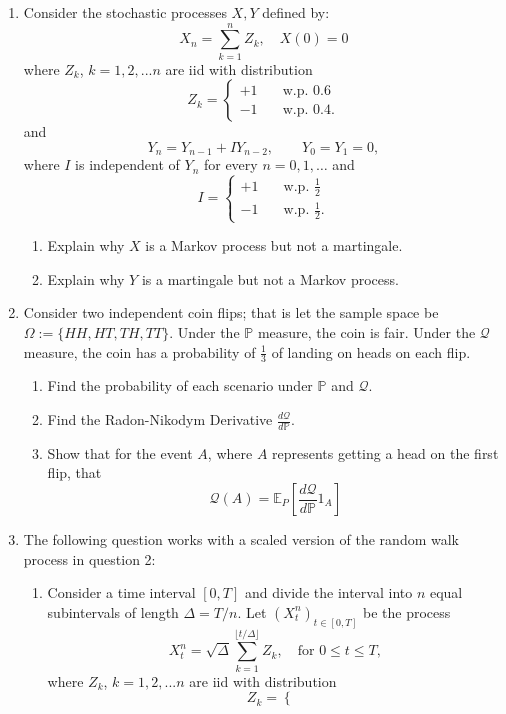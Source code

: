 \documentclass[11pt]{article}
\newcommand{\E}{\mathbb{E}}
\newcommand{\PR}{\mathbb{P}}
\newcommand{\Q}{\mathcal{Q}}
\begin{document}
\begin{enumerate}
		\item Consider the stochastic processes \( X, Y \) defined by:
		\[	X_n = \sum_{k=1}^{n}Z_{k},\quad X(0) = 0
		\]
		where $Z_{k}$, $k=1,2,...n$ are iid with distribution 
		\[	Z_{k} = \begin{cases}
			+1 &  \quad \text{w.p. } 0.6 \\
			-1 & \quad \text{w.p. } 0.4.
		\end{cases}
		\]
		and 
		\[
		Y_n = Y_{n-1} + IY_{n-2},\qquad Y_0 = Y_1 = 0,
		\]
		where \( I \) is independent of \( Y_n \) for every \( n=0,1,\ldots \) and 
		\[
		I = \begin{cases}
			+1 &  \quad \text{w.p. } \frac{1}{2} \\
			-1 & \quad \text{w.p. } \frac{1}{2}.
		\end{cases}
		\]
		\begin{enumerate}
			\item Explain why \( X \) is a Markov process but not a martingale.
			\item Explain why \( Y \) is a martingale but not a Markov process.
		\end{enumerate}
		\item Consider two independent coin flips; that is let the sample space be $\Omega:=\{HH, HT, TH, TT\}$. Under the $\PR$ measure, the coin is fair. Under the $\Q$ measure, the coin has a probability of $\frac{1}{3}$ of landing on heads on each flip. 
		\begin{enumerate}
			\item Find the probability of each scenario under $\PR$ and $\Q$.
			\item Find the Radon-Nikodym Derivative $\frac{d\Q}{d\PR}$.
			\item Show that for the event $A$, where $A$ represents getting a head on the first flip, that
			\[	\Q(A) = \E_{P}\left[\frac{d\Q}{d\PR}1_{A}\right]
			\]
		\end{enumerate}
		\item The following question works with a scaled version of the random walk process in question 2:
		\begin{enumerate}
			\item Consider a time interval $[0, T]$ and divide the interval into $n$ equal subintervals of length $\Delta = T/n$. Let $(X_t^{n})_{t\in[0,T]}$ be the process
			\[	X_t^{n} = \sqrt{\Delta}\sum_{k=1}^{\lfloor t/\Delta \rfloor}Z_{k}, \quad \text{for } 0\leq t\leq T,
			\]
			where $Z_{k}$, $k=1,2,...n$ are iid with distribution 
			\[	Z_{k} = \begin{cases}

\end{cases}\]
\end{enumerate}
\end{enumerate}
\end{document}
